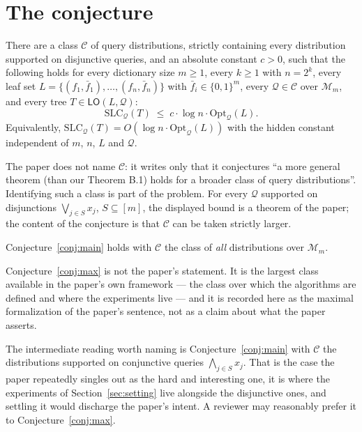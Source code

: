 \documentclass{aicr-conjecture}
\newcommand{\bits}{\{0,1\}}
\newcommand{\Qd}{\mathcal{Q}}
\newcommand{\Mon}{\mathcal{M}}
\newcommand{\SLC}{\mathrm{SLC}}
\newcommand{\Opt}{\mathrm{Opt}}
\newcommand{\LO}{\mathsf{LO}}
\begin{document}
\section{The conjecture}\label{sec:conjectures}

\begin{conjecture}\label{conj:main}
There are a class $\mathcal{C}$ of query distributions, strictly containing
every distribution supported on disjunctive queries, and an absolute
constant $c > 0$, such that the following holds for every dictionary size
$m \ge 1$, every $k \ge 1$ with $n = 2^{k}$, every leaf set
$L = \{(f_1,\bar f_1),\dots,(f_n,\bar f_n)\}$ with
$\bar f_i \in \bits^{m}$, every $\Qd \in \mathcal{C}$ over $\Mon_m$, and
every tree $T \in \LO(L,\Qd)$:
\[
  \SLC_{\Qd}(T) \;\le\; c \cdot \log n \cdot \Opt_{\Qd}(L).
\]
Equivalently, $\SLC_{\Qd}(T) = O(\log n \cdot \Opt_{\Qd}(L))$ with the
hidden constant independent of $m$, $n$, $L$ and $\Qd$.
\end{conjecture}

The paper does not name $\mathcal{C}$: it writes only that it conjectures
``a more general theorem (than our Theorem B.1) holds for a broader class
of query distributions''. Identifying such a class is part of the problem.
For every $\Qd$ supported on disjunctions $\bigvee_{j \in S} x_j$,
$S \subseteq [m]$, the displayed bound is a theorem of the paper; the
content of the conjecture is that $\mathcal{C}$ can be taken strictly
larger.

\begin{conjecture}\label{conj:max}
Conjecture~\ref{conj:main} holds with $\mathcal{C}$ the class of
\emph{all} distributions over $\Mon_m$.
\end{conjecture}

Conjecture~\ref{conj:max} is not the paper's statement. It is the largest
class available in the paper's own framework --- the class over which the
algorithms are defined and where the experiments live --- and it is
recorded here as the maximal formalization of the paper's sentence, not as
a claim about what the paper asserts.

\begin{remark}\label{rem:conj}
The intermediate reading worth naming is Conjecture~\ref{conj:main} with
$\mathcal{C}$ the distributions supported on conjunctive queries
$\bigwedge_{j \in S} x_j$. That is the case the paper repeatedly singles
out as the hard and interesting one, it is where the experiments of
Section~\ref{sec:setting} live alongside the disjunctive ones, and settling
it would discharge the paper's intent. A reviewer may reasonably prefer it
to Conjecture~\ref{conj:max}.
\end{remark}
\end{document}
